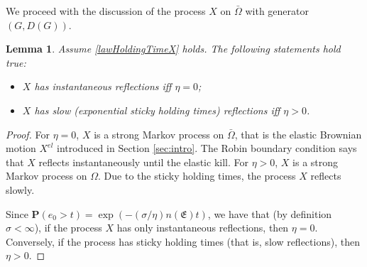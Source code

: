 \documentclass[11pt,a4paper]{article}
\newtheorem{lemma}{Lemma}
\begin{document}
We proceed with the discussion of the process $X$ on $\bar{\Omega}$ with generator $(G,D(G))$. 
\begin{lemma}
\label{LemmaMayOnlyHave}
Assume \eqref{lawHoldingTimeX} holds. The following statements hold true:
\begin{itemize}
\item[i)] $X$ has instantaneous reflections iff $\eta=0$;
\item[ii)] $X$ has slow (exponential sticky holding times) reflections iff $\eta>0$.
\end{itemize}
\end{lemma}
\begin{proof}
For $\eta=0$, $X$ is a strong Markov process on $\bar{\Omega}$, that is the elastic Brownian motion $X^{el}$ introduced in Section \ref{sec:intro}. The Robin boundary condition says that $X$ reflects instantaneously until the elastic kill. For $\eta>0$, $X$ is a strong Markov process on $\Omega$. Due to the  sticky holding times, the process $X$ reflects slowly. 

Since $\mathbf{P}(e_0 >t) = \exp( -(\sigma/\eta)n(\mathfrak{E}) t)$, we have that (by definition $\sigma <\infty$), if the process $X$ has only instantaneous reflections, then $\eta=0$. Conversely, if the process has  sticky holding times (that is, slow reflections), then $\eta >0$.
\end{proof}
\end{document}

